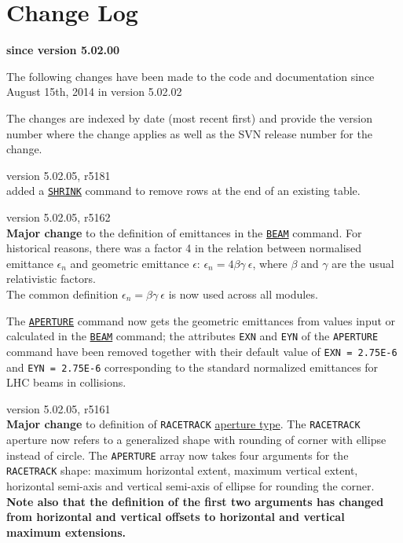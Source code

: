 \chapter*{Change Log}
\label{chap:changelog}

\begin{center} 
\textbf{since version 5.02.00}
\end{center}

The following changes have been made to the code and documentation since
August 15th, 2014 in version 5.02.02

The changes are indexed by date (most recent first) and provide the \madx 
version number where the change applies as well as the SVN 
release number for the change. 

\begin{madlist}

   version 5.02.05, r5181\\
  added a \hyperref[sec:shrink]{\tt SHRINK} command to remove 
  rows at the end of an existing table.

   version 5.02.05, r5162\\
  {\bf Major change} to the definition of emittances in the 
  \hyperref[chap:beam]{\tt BEAM} command. For historical reasons, 
  there was a factor 4 in the relation between normalised emittance 
  $\epsilon_n$ and geometric emittance $\epsilon$: 
  $\epsilon_n = 4 \beta \gamma \ \epsilon$, where $\beta$ and 
  $\gamma$ are the usual relativistic factors. \\
  The common definition $\epsilon_n = \beta \gamma \ \epsilon$ 
  is now used across all \madx modules.
  
  The \hyperref[sec:aperture]{\tt APERTURE} command now gets the 
  geometric emittances from values input or calculated in the 
  \hyperref[chap:beam]{\tt BEAM} command; the attributes {\tt EXN} 
  and {\tt EYN} of the {\tt APERTURE} command have been removed 
  together with their default value of {\tt EXN = 2.75E-6} and 
  {\tt EYN = 2.75E-6} corresponding to the standard normalized 
  emittances for LHC beams in collisions. 
  

   version 5.02.05, r5161\\
  {\bf Major change} to definition of {\tt RACETRACK} 
  \hyperref[sec:def_aper]{aperture type}. 
  The {\tt RACETRACK} aperture now refers to a generalized shape 
  with rounding of corner with ellipse instead of circle. 
  The {\tt APERTURE} array now takes four arguments for the 
  {\tt RACETRACK} shape: maximum horizontal extent, maximum 
  vertical extent, horizontal semi-axis and vertical semi-axis 
  of ellipse for rounding the corner. \\
  {\bf Note also that the definition of the first two arguments 
  has changed from horizontal and vertical offsets to horizontal 
  and vertical maximum extensions.}


\end{madlist}
